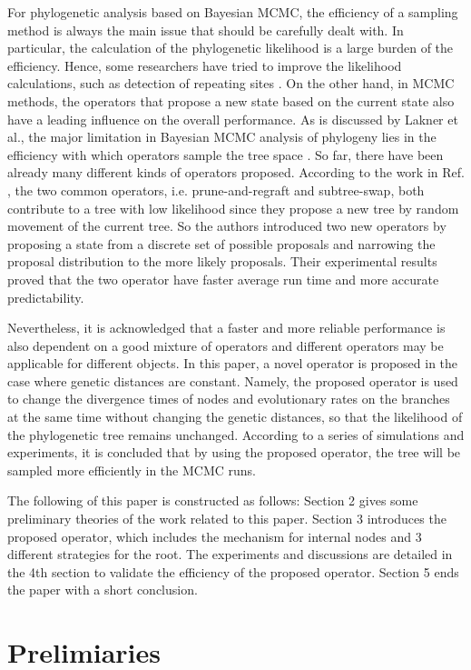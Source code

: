 \documentclass{bmcart}
\begin{document}
For phylogenetic analysis based on Bayesian MCMC, the efficiency of a sampling method is always the main issue that should be carefully dealt with. In particular, the calculation of the phylogenetic likelihood is a large burden of the efficiency. Hence, some researchers have tried to improve the likelihood calculations, such as detection of repeating sites \cite{kobert2017efficient}. On the other hand, in MCMC methods, the operators that propose a new state based on the current state also have a leading influence on the overall performance. As is discussed by Lakner et al., the major limitation in Bayesian MCMC analysis of phylogeny lies in the efficiency with which operators sample the tree space \cite{lakner2008efficiency}. So far, there have been already many different kinds of operators proposed. According to the work in Ref. \cite{hohna2011guided}, the two common operators, i.e. prune-and-regraft and subtree-swap, both contribute to a tree with low likelihood since they propose a new tree by random movement of the current tree. So the authors introduced two new operators by proposing a state from a discrete set of possible proposals and narrowing the proposal distribution to the more likely proposals. Their experimental results proved that the two operator have faster average run time and more accurate predictability.

Nevertheless, it is acknowledged that a faster and more reliable performance is also dependent on a good mixture of operators and different operators may be applicable for different objects. In this paper, a novel operator is proposed in the case where genetic distances are constant. Namely, the proposed operator is used to change the divergence times of nodes and evolutionary rates on the branches at the same time without changing the genetic distances, so that the likelihood of the phylogenetic tree remains unchanged. According to a series of simulations and experiments, it is concluded that by using the proposed operator, the tree will be sampled more efficiently in the MCMC runs.

The following of this paper is constructed as follows: Section 2 gives some preliminary theories of the work related to this paper. Section 3 introduces the proposed operator, which includes the mechanism for internal nodes and 3 different strategies for the root. The experiments and discussions are detailed in the 4th section to validate the efficiency of the proposed operator. Section 5 ends the paper with a short conclusion.
\section*{Prelimiaries}
\end{document}
